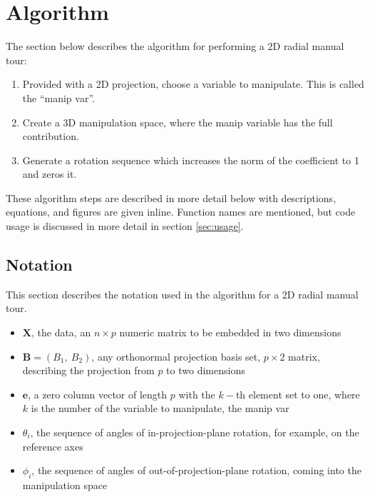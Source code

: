 \hypertarget{sec:algorithm}{%
\section{Algorithm}\label{sec:algorithm}}

The section below describes the algorithm for performing a 2D radial
manual tour:

\begin{enumerate}
\def\labelenumi{\arabic{enumi}.}
\tightlist
\item
  Provided with a 2D projection, choose a variable to manipulate. This
  is called the ``manip var''.
\item
  Create a 3D manipulation space, where the manip variable has the full
  contribution.
\item
  Generate a rotation sequence which increases the norm of the
  coefficient to 1 and zeros it.
\end{enumerate}

These algorithm steps are described in more detail below with
descriptions, equations, and figures are given inline. Function names
are mentioned, but code usage is discussed in more detail in section
\ref{sec:usage}.

\hypertarget{notation}{%
\subsection{Notation}\label{notation}}

This section describes the notation used in the algorithm for a 2D
radial manual tour.

\begin{itemize}
  \item $\textbf{X}$, the data, an $n \times p$ numeric matrix to be embedded in two dimensions
  \item $\textbf{B} = (B_1,~ B_2)$, any orthonormal projection basis set, $p \times 2$ matrix, describing the projection from $p$ to two dimensions
  \item $\textbf{e}$, a zero column vector of length $p$ with the $k-$th element set to one, where $k$ is the number of the variable to manipulate, the manip var
  \item $\theta_i$, the sequence of angles of in-projection-plane rotation, for example, on the reference axes
  \item $\phi_i$, the sequence of angles of out-of-projection-plane rotation, coming into the manipulation space
\end{itemize}

